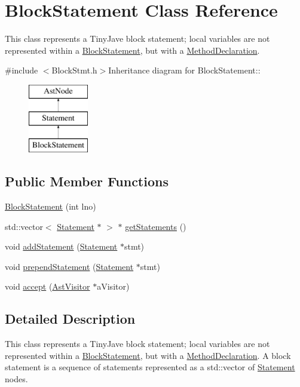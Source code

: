 \hypertarget{classBlockStatement}{
\section{BlockStatement Class Reference}
\label{classBlockStatement}
}


This class represents a TinyJave block statement; local variables are not represented within a \hyperlink{classBlockStatement}{BlockStatement}, but with a \hyperlink{classMethodDeclaration}{MethodDeclaration}.  


{\ttfamily \#include $<$BlockStmt.h$>$}Inheritance diagram for BlockStatement::\begin{figure}[H]
\begin{center}
\leavevmode
\includegraphics[height=3cm]{classBlockStatement}
\end{center}
\end{figure}
\subsection*{Public Member Functions}
\begin{DoxyCompactItemize}
\item 
\hyperlink{classBlockStatement_a7d28cb688a765ca809bc55aa75e0b245}{BlockStatement} (int lno)
\item 
std::vector$<$ \hyperlink{classStatement}{Statement} $\ast$ $>$ $\ast$ \hyperlink{classBlockStatement_a049f6ad899e8480dd3b55bab8f442928}{getStatements} ()
\item 
void \hyperlink{classBlockStatement_adbd315994e8319333c0f7cd22681ec31}{addStatement} (\hyperlink{classStatement}{Statement} $\ast$stmt)
\item 
void \hyperlink{classBlockStatement_a36f2db846cf7f7a559e8b19b5e3d5c01}{prependStatement} (\hyperlink{classStatement}{Statement} $\ast$stmt)
\item 
void \hyperlink{classBlockStatement_a20df05e7536e375226639b483e8c4732}{accept} (\hyperlink{classAstVisitor}{AstVisitor} $\ast$aVisitor)
\end{DoxyCompactItemize}


\subsection{Detailed Description}
This class represents a TinyJave block statement; local variables are not represented within a \hyperlink{classBlockStatement}{BlockStatement}, but with a \hyperlink{classMethodDeclaration}{MethodDeclaration}. A block statement is a sequence of statements represented as a std::vector of \hyperlink{classStatement}{Statement} nodes. 

